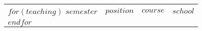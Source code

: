 \begin{tabular}{llll}
  $for(teaching)$
    $semester$ & $position$ & $course$ & $school$ \\
  $endfor$
\end{tabular}
